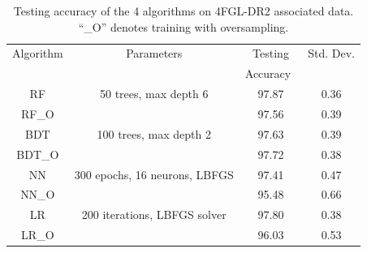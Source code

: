 \begin{table}[!h]
\centering
    \tiny
    \renewcommand{\tabcolsep}{0.4mm}
\renewcommand{\arraystretch}{1.6}

    \begin{tabular}{ c c c c }
    \hline
    \hline
    Algorithm&Parameters &  Testing&Std. Dev.\\
    & & Accuracy\ &  \\
    \hline
    RF& 50 trees, max depth 6  &97.87 & 0.36\\
    RF\_O   &&97.56&0.39 \\
    \hline
    BDT & 100 trees, max depth 2    &   97.63 &0.39\\
    BDT\_O&&97.72&0.38\\
    \hline
    NN & 300 epochs, 16 neurons, LBFGS  & 97.41 & 0.47\\
    NN\_O&&95.48&0.66\\
    \hline
    LR & 200 iterations, LBFGS solver & 97.80&0.38\\
    LR\_O&&96.03&0.53\\
    \hline
     
    \end{tabular}%
    \vspace{2mm}
    \caption{Testing accuracy of the 4 algorithms on 4FGL-DR2 associated data. ``\_O'' denotes training with oversampling.}
    \label{tab:selected_algs2}
\end{table}


